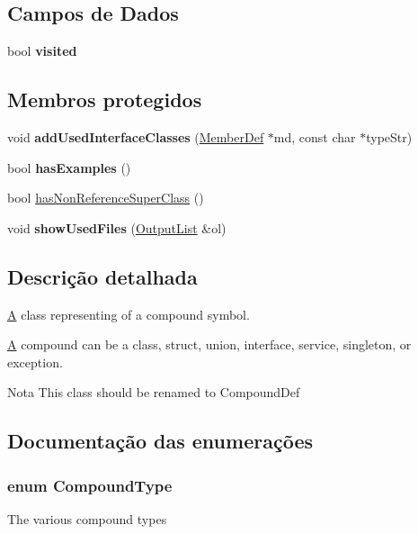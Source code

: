\subsection*{Campos de Dados}
\begin{DoxyCompactItemize}
\item 
\hypertarget{class_class_def_a1df99df902f5f6e81ec3e21e9c07360e}{bool {\bfseries visited}}\label{class_class_def_a1df99df902f5f6e81ec3e21e9c07360e}

\end{DoxyCompactItemize}
\subsection*{Membros protegidos}
\begin{DoxyCompactItemize}
\item 
\hypertarget{class_class_def_acf5a375626d9599b5921a39d03453bf7}{void {\bfseries add\-Used\-Interface\-Classes} (\hyperlink{class_member_def}{Member\-Def} $\ast$md, const char $\ast$type\-Str)}\label{class_class_def_acf5a375626d9599b5921a39d03453bf7}

\item 
\hypertarget{class_class_def_aedb1f21e05c55f8b390afce2c4b456d9}{bool {\bfseries has\-Examples} ()}\label{class_class_def_aedb1f21e05c55f8b390afce2c4b456d9}

\item 
bool \hyperlink{class_class_def_a88bf73ff5acb49894f0ca3a6af172565}{has\-Non\-Reference\-Super\-Class} ()
\item 
\hypertarget{class_class_def_a2c097a052637695d49d7234503a2c22e}{void {\bfseries show\-Used\-Files} (\hyperlink{class_output_list}{Output\-List} \&ol)}\label{class_class_def_a2c097a052637695d49d7234503a2c22e}

\end{DoxyCompactItemize}


\subsection{Descrição detalhada}
\hyperlink{class_a}{A} class representing of a compound symbol.

\hyperlink{class_a}{A} compound can be a class, struct, union, interface, service, singleton, or exception. \begin{DoxyNote}{Nota}
This class should be renamed to Compound\-Def 
\end{DoxyNote}


\subsection{Documentação das enumerações}
\hypertarget{class_class_def_a768a6f0a6fd7e9087ff7971abbcc3f36}{
\subsubsection[{Compound\-Type}]{\setlength{\rightskip}{0pt plus 5cm}enum {\bf Compound\-Type}}}\label{class_class_def_a768a6f0a6fd7e9087ff7971abbcc3f36}
The various compound types 

